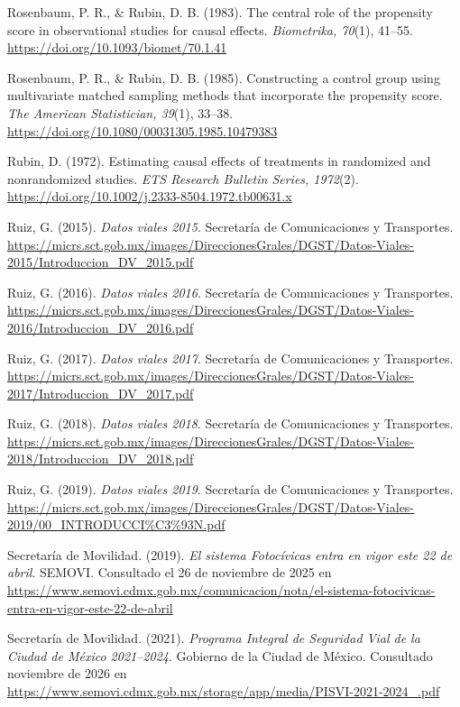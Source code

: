 \begin{thebibliography}{}
Rosenbaum, P. R., \& Rubin, D. B. (1983). The central role of the propensity score in observational studies for causal effects. \textit{Biometrika, 70}(1), 41–55. \url{https://doi.org/10.1093/biomet/70.1.41}

Rosenbaum, P. R., \& Rubin, D. B. (1985). Constructing a control group using multivariate matched sampling methods that incorporate the propensity score. \textit{The American Statistician, 39}(1), 33–38. \url{https://doi.org/10.1080/00031305.1985.10479383}

Rubin, D. (1972). Estimating causal effects of treatments in randomized and nonrandomized studies. \textit{ETS Research Bulletin Series, 1972}(2). \url{https://doi.org/10.1002/j.2333-8504.1972.tb00631.x}

Ruiz, G. (2015). \textit{Datos viales 2015}. Secretaría de Comunicaciones y Transportes. \url{https://micrs.sct.gob.mx/images/DireccionesGrales/DGST/Datos-Viales-2015/Introduccion_DV_2015.pdf}

Ruiz, G. (2016). \textit{Datos viales 2016}. Secretaría de Comunicaciones y Transportes. \url{https://micrs.sct.gob.mx/images/DireccionesGrales/DGST/Datos-Viales-2016/Introduccion_DV_2016.pdf}

Ruiz, G. (2017). \textit{Datos viales 2017}. Secretaría de Comunicaciones y Transportes. \url{https://micrs.sct.gob.mx/images/DireccionesGrales/DGST/Datos-Viales-2017/Introduccion_DV_2017.pdf}

Ruiz, G. (2018). \textit{Datos viales 2018}. Secretaría de Comunicaciones y Transportes. \url{https://micrs.sct.gob.mx/images/DireccionesGrales/DGST/Datos-Viales-2018/Introduccion_DV_2018.pdf}

Ruiz, G. (2019). \textit{Datos viales 2019}. Secretaría de Comunicaciones y Transportes. \url{https://micrs.sct.gob.mx/images/DireccionesGrales/DGST/Datos-Viales-2019/00_INTRODUCCI%C3%93N.pdf}

Secretaría de Movilidad. (2019). \textit{El sistema Fotoc\'ivicas entra en vigor este 22 de abril}. SEMOVI. Consultado el 26 de noviembre de 2025 en \url{https://www.semovi.cdmx.gob.mx/comunicacion/nota/el-sistema-fotocivicas-entra-en-vigor-este-22-de-abril}

Secretaría de Movilidad. (2021). \textit{Programa Integral de Seguridad Vial de la Ciudad de México 2021–2024}. Gobierno de la Ciudad de México. Consultado noviembre de 2026 en \url{https://www.semovi.cdmx.gob.mx/storage/app/media/PISVI-2021-2024_.pdf}


\end{thebibliography}
